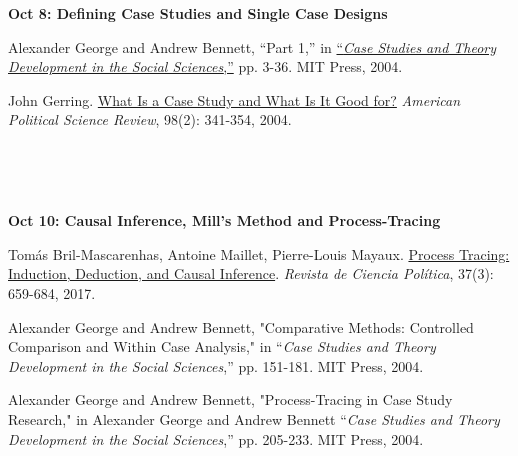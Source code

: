 \documentclass[letterpaper]{article}
\renewenvironment{itemize}{
  \begin{list}{}{
    \setlength{\leftmargin}{1.5em}
  }
}{
  \end{list}
}
\begin{document}
\begin{enumerate}
		\begin{itemize}
		\item {\bf Oct 8: Defining Case Studies and Single Case Designs}
			\begin{itemize}
				\item[$\bullet$] Alexander George and Andrew Bennett, ``Part 1,'' in \href{https://pdfs.semanticscholar.org/94e9/eec015c650880356853533c4dc9b2dac42bb.pdf}{``\emph{Case Studies and Theory Development in the Social Sciences},''} pp. 3-36. MIT Press, 2004. %
				\item[$\bullet$] John Gerring. \href{https://www.cambridge.org/core/services/aop-cambridge-core/content/view/S0003055404001182}{What Is a Case Study and What Is It Good for?} \emph{American Political Science Review}, 98(2): 341-354, 2004. 
			\end{itemize}
		\end{itemize}



~\\
\item[] \begin{center}{\color{blue}{\bf Monday Oct 15: National Holiday: No class.}}\end{center}
~\\

		\begin{itemize}
		\item {\bf Oct 10: Causal Inference, Mill's Method and Process-Tracing}
			\begin{itemize}
				\item[$\bullet$]  Tom\'as Bril-Mascarenhas, Antoine Maillet, Pierre-Louis Mayaux. \href{http://www.revistacienciapolitica.cl/index.php/rcp/article/view/354/73}{Process Tracing: Induction, Deduction, and Causal Inference}. \emph{Revista de Ciencia Pol\'itica}, 37(3): 659-684, 2017.
				\item[$\bullet$] Alexander George and Andrew Bennett, "Comparative Methods: Controlled Comparison and Within Case Analysis," in ``\emph{Case Studies and Theory Development in the Social Sciences},'' pp. 151-181. MIT Press, 2004.
				\item[$\bullet$] Alexander George and Andrew Bennett, "Process-Tracing in Case Study Research," in Alexander George and Andrew Bennett ``\emph{Case Studies and Theory Development in the Social Sciences},'' pp. 205-233. MIT Press, 2004.  
			\end{itemize}
		\end{itemize}



\end{enumerate}
\end{document}
